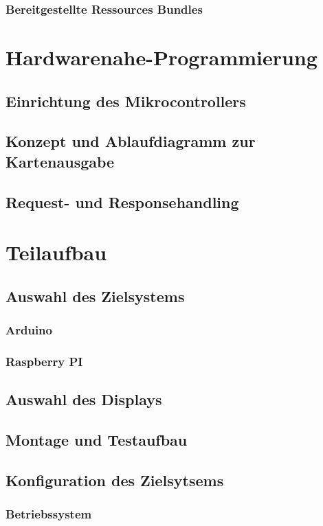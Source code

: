 \subsubsection{Bereitgestellte Ressources Bundles}

\section{Hardwarenahe-Programmierung}
\subsection{Einrichtung des Mikrocontrollers}
\subsection{Konzept und Ablaufdiagramm zur Kartenausgabe}
\subsection{Request- und Responsehandling}
\section{Teilaufbau}
\subsection{Auswahl des Zielsystems}
\subsubsection{Arduino}
\subsubsection{Raspberry PI}
\subsection{Auswahl des Displays}
\subsection{Montage und Testaufbau}
\subsection{Konfiguration des Zielsytsems}
\subsubsection{Betriebssystem}
